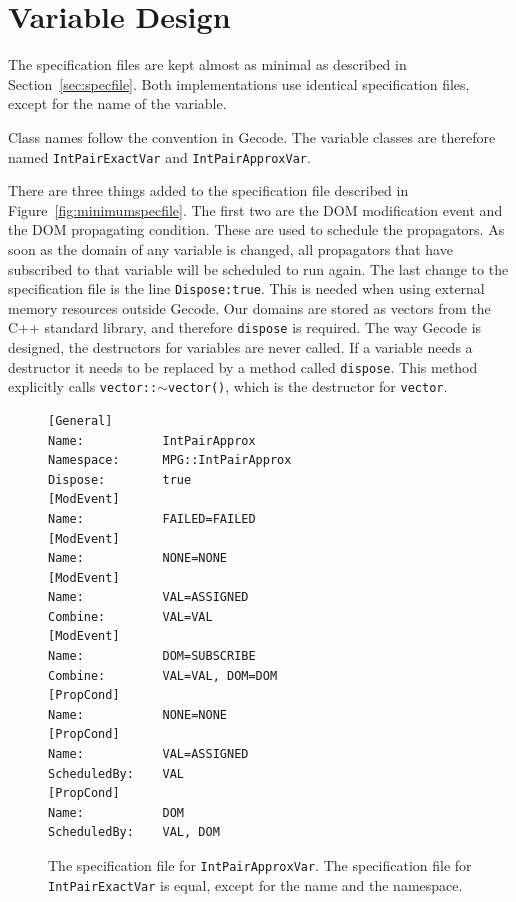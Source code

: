 \documentclass[a4paper,11pt]{article}
\begin{document}


\section{Variable Design}
The specification files are kept almost as minimal as described in Section~\ref{sec:specfile}. Both implementations use identical specification files, except for the name of the variable. 

Class names follow the convention in Gecode. The variable classes are therefore named \texttt{IntPairExactVar} and \texttt{IntPairApproxVar}. 

There are three things added to the specification file described in Figure~\ref{fig:minimumspecfile}. The first two are the DOM modification event and the DOM propagating condition. These are used to schedule the propagators. As soon as the domain of any variable is changed, all propagators that have subscribed to that variable will be scheduled to run again. The last change to the specification file is the line \texttt{Dispose:true}. This is needed when using external memory resources outside Gecode. Our domains are stored as vectors from the C++ standard library, and therefore \texttt{dispose} is required. The way Gecode is designed, the destructors for variables are never called. If a variable needs a destructor it needs to be replaced by a method called \texttt{dispose}. This method explicitly calls \texttt{vector::$\sim$vector()}, which is the destructor for \texttt{vector}.

\begin{figure}[t]
\begin{minipage}{\linewidth}
\begin{lstlisting}[frame=single]
[General]
Name:           IntPairApprox
Namespace:      MPG::IntPairApprox
Dispose:        true
[ModEvent]
Name:           FAILED=FAILED
[ModEvent]
Name:           NONE=NONE
[ModEvent]
Name:           VAL=ASSIGNED
Combine:        VAL=VAL
[ModEvent]
Name:           DOM=SUBSCRIBE
Combine:        VAL=VAL, DOM=DOM
[PropCond]
Name:           NONE=NONE
[PropCond]
Name:           VAL=ASSIGNED
ScheduledBy:    VAL
[PropCond]
Name:           DOM
ScheduledBy:    VAL, DOM
\end{lstlisting}
\end{minipage}
\caption{The specification file for \texttt{IntPairApproxVar}. The specification file for \texttt{IntPairExactVar} is equal, except for the name and the namespace.}
\end{figure}
\end{document}

